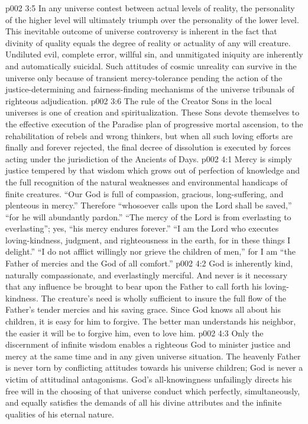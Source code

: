 \pc \vs p002 3:5 In any universe contest between actual levels of reality, the personality of the higher level will ultimately triumph over the personality of the lower level. This inevitable outcome of universe controversy is inherent in the fact that divinity of quality equals the degree of reality or actuality of any will creature. Undiluted evil, complete error, willful sin, and unmitigated iniquity are inherently and automatically suicidal. Such attitudes of cosmic unreality can survive in the universe only because of transient mercy\hyp{}tolerance pending the action of the justice\hyp{}determining and fairness\hyp{}finding mechanisms of the universe tribunals of righteous adjudication.
\vs p002 3:6 The rule of the Creator Sons in the local universes is one of creation and spiritualization. These Sons devote themselves to the effective execution of the Paradise plan of progressive mortal ascension, to the rehabilitation of rebels and wrong thinkers, but when all such loving efforts are finally and forever rejected, the final decree of dissolution is executed by forces acting under the jurisdiction of the Ancients of Days.\plusone
{}
\vs p002 4:1 Mercy is simply justice tempered by that wisdom which grows out of perfection of knowledge and the full recognition of the natural weaknesses and environmental handicaps of finite creatures. “Our God is full of compassion, gracious, long\hyp{}suffering, and plenteous in mercy.” Therefore “whosoever calls upon the Lord shall be saved,” “for he will abundantly pardon.” “The mercy of the Lord is from everlasting to everlasting”; yes, “his mercy endures forever.” “I am the Lord who executes loving\hyp{}kindness, judgment, and righteousness in the earth, for in these things I delight.” “I do not afflict willingly nor grieve the children of men,” for I am “the Father of mercies and the God of all comfort.”
\vs p002 4:2 God is inherently kind, naturally compassionate, and everlastingly merciful. And never is it necessary that any influence be brought to bear upon the Father to call forth his loving\hyp{}kindness. The creature’s need is wholly sufficient to insure the full flow of the Father’s tender mercies and his saving grace. Since God knows all about his children, it is easy for him to forgive. The better man understands his neighbor, the easier it will be to forgive him, even to love him.
\pc \vs p002 4:3 Only the discernment of infinite wisdom enables a righteous God to minister justice and mercy at the same time and in any given universe situation. The heavenly Father is never torn by conflicting attitudes towards his universe children; God is never a victim of attitudinal antagonisms. God’s all\hyp{}knowingness unfailingly directs his free will in the choosing of that universe conduct which perfectly, simultaneously, and equally satisfies the demands of all his divine attributes and the infinite qualities of his eternal nature.
